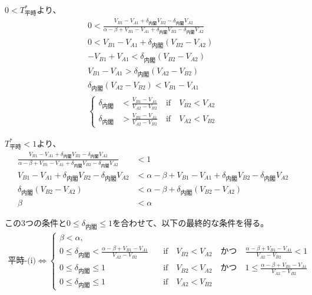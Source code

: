 \documentclass[main.tex]{subfiles}
\begin{document}
$0<T^*_{平時}$より、
\begin{align*}
    0 < \frac{ V_{B1} - V_{A1} +\delta_{内閣}V_{B2} - \delta_{内閣}V_{A2} }{ \alpha-\beta + V_{B1}-V_{A1} + \delta_{内閣}V_{B2} - \delta_{内閣}V_{A2} }\\
    0 <  V_{B1} - V_{A1} +\delta_{内閣}(V_{B2} - V_{A2})\\
    -V_{B1} + V_{A1} < \delta_{内閣}(V_{B2} - V_{A2})\\
    V_{B1} - V_{A1} > \delta_{内閣}(V_{A2} - V_{B2})\\
    \delta_{内閣}(V_{A2} - V_{B2}) < V_{B1} - V_{A1}\\
    \begin{cases}
        \delta_{内閣} &< \frac{V_{B1} - V_{A1}}{V_{A2} - V_{B2}} \quad\text{if}\quad V_{B2} < V_{A2}\\
        \delta_{内閣} &> \frac{V_{B1} - V_{A1}}{V_{A2} - V_{B2}} \quad\text{if}\quad V_{A2} < V_{B2}
      \end{cases}
\end{align*}


$T^*_{平時}<1$より、
\begin{align*}
    \frac{ V_{B1} - V_{A1} +\delta_{内閣}V_{B2} - \delta_{内閣}V_{A2} }{ \alpha-\beta + V_{B1}-V_{A1} + \delta_{内閣}V_{B2} - \delta_{内閣}V_{A2} } &< 1\\
    V_{B1} - V_{A1} +\delta_{内閣}V_{B2} - \delta_{内閣}V_{A2} &< \alpha-\beta + V_{B1}-V_{A1} + \delta_{内閣}V_{B2} - \delta_{内閣}V_{A2}\\
    \delta_{内閣}(V_{B2} - V_{A2}) &< \alpha-\beta + \delta_{内閣}(V_{B2} - V_{A2})\\
    \beta &< \alpha
\end{align*}


この3つの条件と$0 \le \delta_{内閣} \le 1$を合わせて、以下の最終的な条件を得る。
\begin{align*}
    \text{平時-(i)} \Leftrightarrow 
    \begin{cases}
        \beta < \alpha, \\
        0 \le \delta_{内閣} < \frac{\alpha-\beta + V_{B1}-V_{A1}}{V_{A2} - V_{B2}} \quad&\text{if}\quad V_{B2} < V_{A2} \quad{かつ}\quad \frac{\alpha-\beta + V_{B1}-V_{A1}}{V_{A2} - V_{B2}}<1\\
        0 \le \delta_{内閣} \le 1 \quad&\text{if}\quad V_{B2} < V_{A2} \quad{かつ}\quad 1 \le \frac{\alpha-\beta + V_{B1}-V_{A1}}{V_{A2} - V_{B2}}\\
        0 \le \delta_{内閣} \le 1 \quad&\text{if}\quad V_{A2} < V_{B2}
    \end{cases}
\end{align*}
\end{document}
